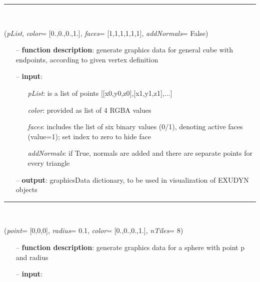 \begin{itemize}[leftmargin=1.4cm]
\begin{itemize}[leftmargin=0.5cm]
\begin{itemize}[leftmargin=1.4cm]
\begin{itemize}[leftmargin=1.4cm]
\begin{itemize}[leftmargin=0.5cm]
\begin{itemize}[leftmargin=1.4cm]
\begin{itemize}[leftmargin=0.5cm]
%
\noindent\rule{8cm}{0.75pt}\vspace{1pt} \\ 
\begin{flushleft}
\label{sec:graphicsDataUtilities:GraphicsDataCube}
({\it pList}, {\it color}= [0.,0.,0.,1.], {\it faces}= [1,1,1,1,1,1], {\it addNormals}= False)
\end{flushleft}
\setlength{\itemindent}{0.7cm}
\begin{itemize}[leftmargin=0.7cm]
  \item[--]  {\bf function description}: generate graphics data for general cube with endpoints, according to given vertex definition  \item[--]  {\bf input}: \vspace{-6pt}
  \begin{itemize}[leftmargin=1.2cm]
\setlength{\itemindent}{-0.7cm}
    \item[] {\it pList}: is a list of points [[x0,y0,z0],[x1,y1,z1],...]
    \item[] {\it   color}: provided as list of 4 RGBA values
    \item[] {\it   faces}: includes the list of six binary values (0/1), denoting active faces (value=1); set index to zero to hide face
    \item[] {\it   addNormals}: if True, normals are added and there are separate points for every triangle
  \end{itemize}
  \item[--]  {\bf output}: graphicsData dictionary, to be used in visualization of EXUDYN objects\vspace{12pt}\end{itemize}
%
\noindent\rule{8cm}{0.75pt}\vspace{1pt} \\ 
\begin{flushleft}
\label{sec:graphicsDataUtilities:GraphicsDataSphere}
({\it point}= [0,0,0], {\it radius}= 0.1, {\it color}= [0.,0.,0.,1.], {\it nTiles}= 8)
\end{flushleft}
\setlength{\itemindent}{0.7cm}
\begin{itemize}[leftmargin=0.7cm]
  \item[--]  {\bf function description}: generate graphics data for a sphere with point p and radius  \item[--]  {\bf input}: \vspace{-6pt}

\end{itemize}
\end{itemize}
\end{itemize}
\end{itemize}
\end{itemize}
\end{itemize}
\end{itemize}
\end{itemize}
